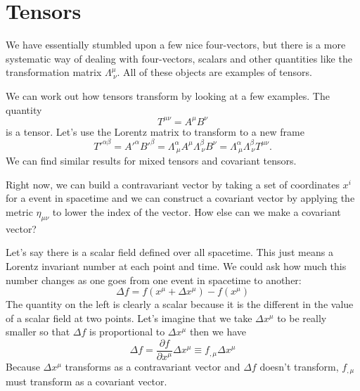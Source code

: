 \section{Tensors}
\label{sec:tensors}

We have essentially stumbled upon a few nice four-vectors, but there
is a more systematic way of dealing with four-vectors, scalars and
other quantities like the transformation matrix $\Lambda^\mu_{~\nu}$.
All of these objects are examples of tensors.

We can work out how tensors transform by looking at a few examples.  
The quantity
\begin{equation}
T^{\mu\nu} = A^{\mu} B^{\nu}
\label{eq:298}
\end{equation}
is a tensor.  Let's use the Lorentz matrix to transform to a new frame
\begin{equation}
T'^{\alpha\beta} = A'^{\alpha} B'^{\beta} = \Lambda^\alpha_{~\mu} A^{\mu}
\Lambda^\beta_{~\nu} B^{\nu} = \Lambda^\alpha_{~\mu} 
\Lambda^\beta_{~\nu} T^{\mu\nu}.
\label{eq:299}
\end{equation}
We can find similar results for mixed tensors and covariant tensors.

Right now, we can build a contravariant vector by taking a set of
coordinates $x^i$ for a event in spacetime and we can construct a
covariant vector by applying the metric $\eta_{\mu\nu}$ to lower the
index of the vector.  How else can we make a covariant vector?

Let's say there is a scalar field defined over all spacetime.  This just means a 
Lorentz invariant number at each point and time.   We could ask how much this number 
changes as one goes from one event in spacetime to another:
\begin{equation}
\Delta f = f \left (x^{\mu} + \Delta x^\mu \right) -  f \left (x^{\mu}\right)
\label{eq:300}
\end{equation}
The quantity on the left is clearly a scalar because it is the
different in the value of a scalar field at two points.  Let's imagine that we take
$\Delta x^\mu$ to be really smaller so that $\Delta f$ is proportional to 
$\Delta x^\mu$ then we have
\begin{equation}
\Delta f = \frac{\partial f}{\partial x^{\mu}} \Delta x^\mu \equiv f_{,\mu} \Delta x^\mu
\label{eq:301}
\end{equation}
Because $\Delta x^\mu$ transforms as a contravariant vector and $\Delta f$ doesn't 
transform, $f_{,\mu}$ must transform as a covariant vector.

